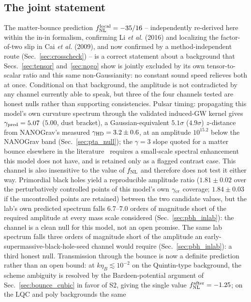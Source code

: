 \documentclass[aps,prd,twocolumn,superscriptaddress,nofootinbib,longbibliography]{revtex4-2}
\newcommand{\fnl}{f_{\rm NL}}
\newcommand{\fnlloc}{f_{\rm NL}^{\rm local}}
\begin{document}
\subsection{The joint statement}

The matter-bounce prediction $\fnlloc=-35/16$ -- independently re-derived here
within the in-in formalism, confirming Li \textit{et al.} (2016) and
localizing the factor-of-two slip in Cai \textit{et al.} (2009), and now
confirmed by a method-independent route (Sec.~\ref{sec:crosscheck}) -- is a
correct statement about a background that Secs.~\ref{sec:tensor}
and~\ref{sec:nogo} show is jointly excluded by its own tensor-to-scalar
ratio and this same non-Gaussianity: no constant sound speed relieves both
at once. Conditional on that background, the amplitude
is not contradicted by any channel currently able to speak, but three of the
four channels tested are honest nulls rather than supporting consistencies.
Pulsar timing: propagating this model's own curvature spectrum
through the validated induced-GW kernel gives $\gamma_{\rm pred}=5.07$
($5.00$, dust bracket), a Gaussian-equivalent $5.1\sigma$ ($4.9\sigma$)
$z$-distance from NANOGrav's measured
$\gamma_{\rm HD}=3.2\pm0.6$, at an amplitude $10^{15.2}$ below the NANOGrav
band (Sec.~\ref{sec:pta_null}); the $\gamma=3$ slope quoted for a matter
bounce elsewhere in the literature~\cite{Papanikolaou2025} requires a
small-scale spectral enhancement this model does not have, and is retained
only as a flagged contrast case. This channel is also insensitive to the
value of $\fnl$ and therefore does not test it either way.
Primordial black holes yield a reproducible amplitude ratio
($1.81\pm0.02$ over the perturbatively controlled points of this model's own
$\gamma_{\rm cr}$ coverage; $1.84\pm0.03$ if the uncontrolled points are retained)
between the two candidate values, but the lab's own predicted spectrum falls
$6.7$--$7.0$ orders of magnitude short of the required amplitude at every mass
scale considered (Sec.~\ref{sec:pbh_inlab}): the channel is a clean null for
this model, not an open promise. The same lab spectrum falls three orders of
magnitude short of the amplitude an early-supermassive-black-hole-seed
channel would require (Sec.~\ref{sec:pbh_inlab}): a third honest null.
Transmission through the bounce is now a definite prediction rather than
an open bound: at $k\eta_B\lesssim10^{-2}$ on the Quintin-type background,
the scheme ambiguity is resolved by the Bardeen-potential argument of
Sec.~\ref{sec:bounce_cubic} in favor of S2, giving the single value
$\fnl^{\rm after}=-1.25$; on the LQC and poly backgrounds the same
\end{document}
